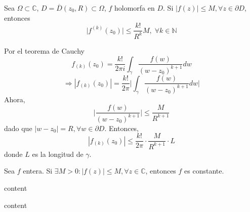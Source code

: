 \begin{theo}
  Sea $\Omega \subset \mathbb{C}$,  $D = \overline{D}(z_{0},R) \subset \Omega$, $f$ holomorfa en $D$. Si $| f(z) | \leq M, \forall z \in \partial{D}$, entonces
  \[ 
    \big | f^{(k)}(z_{0}) \big | \leq \frac{k!}{R^{k}}M, \; \forall k \in \mathbb{N}
  \] 
\end{theo}

\begin{dem}
  Por el teorema de Cauchy
  \[ 
    f_{(k)}(z_{0}) = \frac{k!}{2 \pi i} \int_{\gamma}^{} \frac{f(w)}{(w - z_{0})^{k+1}} dw 
  \] 
  \[ 
    \Rightarrow | f_{(k)}(z_{0}) | = \frac{k!}{2 \pi} \Big | \int_{\gamma}^{} \frac{f(w)}{(w - z_{0})^{k+1}} dw \Big |
  \] 
  Ahora,
  \[ 
    \Big | \frac{f(w)}{(w - z_{0})^{k+1}} \Big | \leq \frac{M}{R^{k+1}}
  \] 
  dado que $| w - z_{0} | = R, \forall w \in \partial D$. Entonces,
  \[ 
     | f_{(k)}(z_{0}) | \leq \frac{k!}{2 \pi} \cdot \frac{M}{R^{k+1}} \cdot L
  \] 
  donde $L$ es la longitud de $\gamma$.
\end{dem}

\begin{theo}[Liouville]
  Sea $f$ entera. Si $\exists M >0 : | f(z) |\leq M, \forall z \in \mathbb{C}$, entonces $f$ es constante.
\end{theo}

\begin{dem}
  content
\end{dem}

\begin{theo}
  content
\end{theo}
